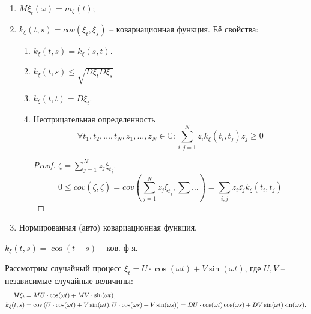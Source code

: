 \begin{enumerate}
  \item $M\xi_t(\omega) = m_\xi(t)$;
  \item $k_\xi (t, s) = cov(\xi_t, \xi_s)$ -- ковариационная функция.
    Её свойства:
    \begin{enumerate}
      \item $k_\xi (t, s) = k_\xi (s, t)$.
      \item $k_\xi (t, s) \leqslant \sqrt{D\xi_t D\xi_s}$
      \item $k_\xi(t, t) = D\xi_t$.
      \item Неотрицательная определенность
        \[
          \forall t_1, t_2, \dots, t_N, z_1, \dots, z_N \in \mathbb{C} : \sum_{i, j = 1}^N z_i k_\xi(t_i, t_j) \bar{z_j} \geqslant 0
        \]
        \begin{proof}
          $\zeta = \sum_{j=1}^N z_j \xi_{t_j}$.
          \[
            0 \leqslant cov(\zeta, \bar{\zeta}) = cov(\sum_{j=1}^N z_j \xi_{t_j}, \sum \dots) = \sum_{i, j} z_i \bar{z_j} k_\xi(t_i, t_j)
          \]
        \end{proof}
    \end{enumerate}
  \item Нормированная (авто) ковариационная функция.
\end{enumerate}

\begin{ex}
  $k_\xi(t, s) = \cos(t-s)$ -- ков. ф-я.
\end{ex}

\begin{ex}
  Рассмотрим случайный процесс $\xi_t = U \cdot \cos(\omega t) + V \sin(\omega t)$,
  где $U, V$ -- независимые случайные величины:
  \begin{align*}
    M\xi_t &= MU \cdot \cos(\omega t) + MV \cdot \sin(\omega t), \\
    k_{\xi}(t, s)
           &= \operatorname{cov} \left( U \cdot \cos(\omega t) + V \sin(\omega t), U \cdot \cos(\omega s) + V \sin(\omega s) \right) 
    = DU \cdot \cos(\omega t) \cos(\omega s) + DV \sin(\omega t) \sin(\omega s).
  \end{align*}
\end{ex}

